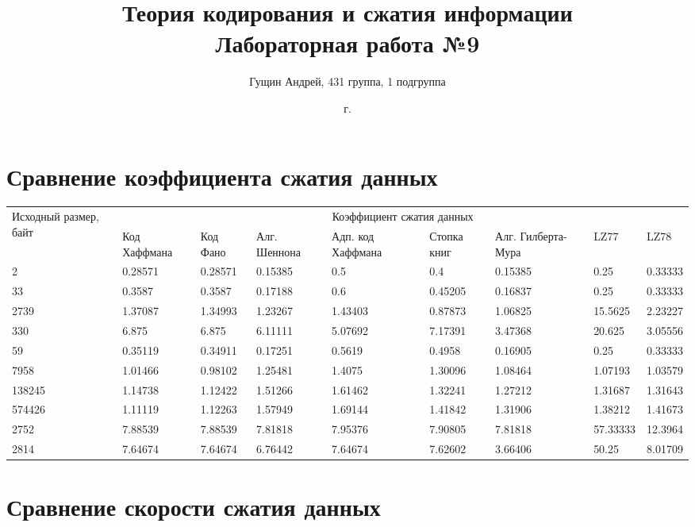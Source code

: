 \documentclass[a4paper,oneside]{article}
\title{{Теория кодирования и сжатия информации}\\{Лабораторная работа №9}}
\author{Гущин Андрей, 431 группа, 1 подгруппа}
\date{\the\year{} г.}
\theoremstyle{definition}
\begin{document}
\maketitle

\section{Сравнение коэффициента сжатия данных}


\begin{table}[H]
  \small
  \centering
  \begin{tabular}{|p{1.5cm}|p{1.5cm}|p{1.5cm}|p{1.5cm}|p{1.5cm}|p{1.5cm}|p{1.5cm}|p{1.5cm}|p{1.5cm}|}
    \hline
    \multirow{2}{1.5cm}{Исходный размер, байт} & \multicolumn{8}{c|}{Коэффициент сжатия данных} \\ \cline{2-9}
    & Код Хаффмана & Код Фано & Алг. Шеннона & Адп. код Хаффмана &
    Стопка книг & Алг. Гилберта-Мура & LZ77 & LZ78 \\ \hline \hline

    2      & 0.28571 & 0.28571 & 0.15385 & 0.5 & 0.4 & 0.15385 & 0.25 & 0.33333 \\ \hline
    33     & 0.3587 & 0.3587 & 0.17188 & 0.6 & 0.45205 & 0.16837 & 0.25 & 0.33333 \\ \hline
    2739   & 1.37087 & 1.34993 & 1.23267 & 1.43403 & 0.87873 & 1.06825 & 15.5625 & 2.23227 \\ \hline
    330    & 6.875 & 6.875 & 6.11111 & 5.07692 & 7.17391 & 3.47368 & 20.625 & 3.05556 \\ \hline
    59     & 0.35119 & 0.34911 & 0.17251 & 0.5619 & 0.4958 & 0.16905 & 0.25 & 0.33333 \\ \hline
    7958   & 1.01466 & 0.98102 & 1.25481 & 1.4075 & 1.30096 & 1.08464 & 1.07193 & 1.03579 \\ \hline
    138245 & 1.14738 & 1.12422 & 1.51266 & 1.61462 & 1.32241 & 1.27212 & 1.31687 & 1.31643 \\ \hline
    574426 & 1.11119 & 1.12263 & 1.57949 & 1.69144 & 1.41842 & 1.31906 & 1.38212 & 1.41673 \\ \hline
    2752   & 7.88539 & 7.88539 & 7.81818 & 7.95376 & 7.90805 & 7.81818 & 57.33333 & 12.3964 \\ \hline
    2814   & 7.64674 & 7.64674 & 6.76442 & 7.64674 & 7.62602 & 3.66406 & 50.25 & 8.01709 \\ \hline
  \end{tabular}
\end{table}

\section{Сравнение скорости сжатия данных}
\end{document}
